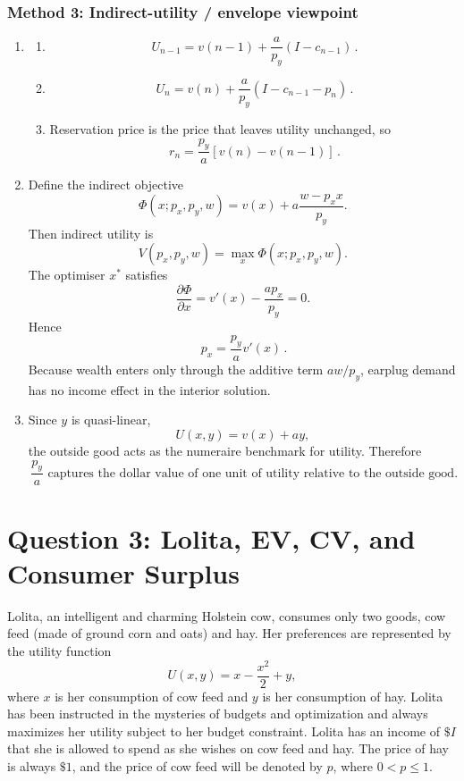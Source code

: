 \documentclass[12pt]{article}
\begin{document}
\newpage
\subsubsection{Method 3: Indirect-utility / envelope viewpoint}
\begin{enumerate}[label=(\alph*)]
    \item
    \begin{enumerate}[label=(\roman*)]
        \item
        \[
        \boxed{\,U_{n-1}=v(n-1)+\frac{a}{p_y}(I-c_{n-1})\, }.
        \]

        \item
        \[
        \boxed{\,U_n=v(n)+\frac{a}{p_y}(I-c_{n-1}-p_n)\, }.
        \]

        \item
        Reservation price is the price that leaves utility unchanged, so
        \[
        \boxed{\,r_n=\frac{p_y}{a}[v(n)-v(n-1)]\, }.
        \]
    \end{enumerate}

    \item
    Define the indirect objective
    \[
    \Phi(x;p_x,p_y,w)=v(x)+a\frac{w-p_xx}{p_y}.
    \]
    Then indirect utility is
    \[
    V(p_x,p_y,w)=\max_x \Phi(x;p_x,p_y,w).
    \]
    The optimiser \(x^*\) satisfies
    \[
    \frac{\partial \Phi}{\partial x}=v'(x)-\frac{ap_x}{p_y}=0.
    \]
    Hence
    \[
    \boxed{\,p_x=\frac{p_y}{a}v'(x)\, }.
    \]
    Because wealth enters only through the additive term \(aw/p_y\), earplug demand has no income effect in the interior solution.

    \item
    Since \(y\) is quasi-linear,
    \[
    U(x,y)=v(x)+ay,
    \]
    the outside good acts as the numeraire benchmark for utility. Therefore
    \[
    \boxed{\,\frac{p_y}{a}\text{ captures the dollar value of one unit of utility relative to the outside good.}\,}
    \]
\end{enumerate}

\newpage

\section{Question 3: Lolita, EV, CV, and Consumer Surplus}

\noindent
Lolita, an intelligent and charming Holstein cow, consumes only two goods, cow feed (made of ground corn and oats) and hay. Her preferences are represented by the utility function
\[
U(x,y)=x-\frac{x^2}{2}+y,
\]
where \(x\) is her consumption of cow feed and \(y\) is her consumption of hay. Lolita has been instructed in the mysteries of budgets and optimization and always maximizes her utility subject to her budget constraint. Lolita has an income of \(\$ I\) that she is allowed to spend as she wishes on cow feed and hay. The price of hay is always \(\$1\), and the price of cow feed will be denoted by \(p\), where \(0<p\le 1\).
\end{document}
